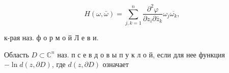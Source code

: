 \documentclass[10pt]{article}
\begin{document}
\[

H(\omega, \bar{\omega})=\sum_{j, k=1}^{n} \frac{\partial^{2} \varphi}{\partial z_{i} \partial \bar{z}_{k}} \omega_{j} \overline{\omega_{k}},

\]



к-рая наз. ф о р м о й Л е в и.



Область $D \subset \mathbb{C}^{n}$ наз. п с е в д о в ы п у к л о й, если для нее функция $-\ln d(z, \partial D)$, где $d(z, \partial D)$ означает
\end{document}
